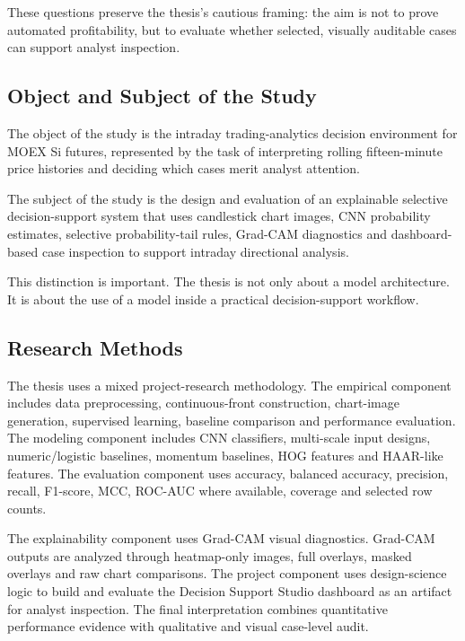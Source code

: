 These questions preserve the thesis's cautious framing: the aim is not to prove automated profitability, but to evaluate whether selected, visually auditable cases can support analyst inspection.

\subsection{Object and Subject of the Study}
\label{subsec:object_subject}

The object of the study is the intraday trading-analytics decision environment for MOEX Si futures, represented by the task of interpreting rolling fifteen-minute price histories and deciding which cases merit analyst attention.

The subject of the study is the design and evaluation of an explainable selective decision-support system that uses candlestick chart images, CNN probability estimates, selective probability-tail rules, Grad-CAM diagnostics and dashboard-based case inspection to support intraday directional analysis.

This distinction is important. The thesis is not only about a model architecture. It is about the use of a model inside a practical decision-support workflow.

\subsection{Research Methods}
\label{subsec:methods}

The thesis uses a mixed project-research methodology. The empirical component includes data preprocessing, continuous-front construction, chart-image generation, supervised learning, baseline comparison and performance evaluation. The modeling component includes CNN classifiers, multi-scale input designs, numeric/logistic baselines, momentum baselines, HOG features and HAAR-like features. The evaluation component uses accuracy, balanced accuracy, precision, recall, F1-score, MCC, ROC-AUC where available, coverage and selected row counts.

The explainability component uses Grad-CAM visual diagnostics. Grad-CAM outputs are analyzed through heatmap-only images, full overlays, masked overlays and raw chart comparisons. The project component uses design-science logic to build and evaluate the Decision Support Studio dashboard as an artifact for analyst inspection. The final interpretation combines quantitative performance evidence with qualitative and visual case-level audit.

